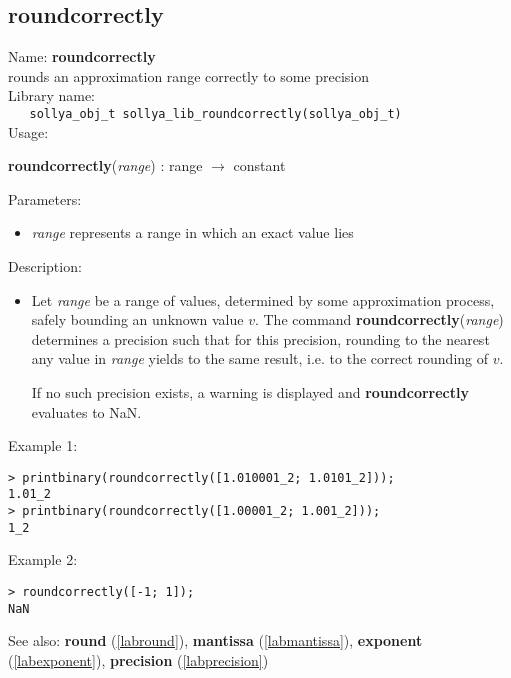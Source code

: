 \subsection{roundcorrectly}
\label{labroundcorrectly}
\noindent Name: \textbf{roundcorrectly}\\
\phantom{aaa}rounds an approximation range correctly to some precision\\[0.2cm]
\noindent Library name:\\
\verb|   sollya_obj_t sollya_lib_roundcorrectly(sollya_obj_t)|\\[0.2cm]
\noindent Usage: 
\begin{center}
\textbf{roundcorrectly}(\emph{range}) : \textsf{range} $\rightarrow$ \textsf{constant}\\
\end{center}
Parameters: 
\begin{itemize}
\item \emph{range} represents a range in which an exact value lies
\end{itemize}
\noindent Description: \begin{itemize}

\item Let \emph{range} be a range of values, determined by some approximation
   process, safely bounding an unknown value $v$. The command
   \textbf{roundcorrectly}(\emph{range}) determines a precision such that for this precision,
   rounding to the nearest any value in \emph{range} yields to the same
   result, i.e. to the correct rounding of $v$.
    
   If no such precision exists, a warning is displayed and \textbf{roundcorrectly}
   evaluates to NaN.
\end{itemize}
\noindent Example 1: 
\begin{center}\begin{minipage}{15cm}\begin{Verbatim}[frame=single]
> printbinary(roundcorrectly([1.010001_2; 1.0101_2]));
1.01_2
> printbinary(roundcorrectly([1.00001_2; 1.001_2]));
1_2
\end{Verbatim}
\end{minipage}\end{center}
\noindent Example 2: 
\begin{center}\begin{minipage}{15cm}\begin{Verbatim}[frame=single]
> roundcorrectly([-1; 1]);
NaN
\end{Verbatim}
\end{minipage}\end{center}
See also: \textbf{round} (\ref{labround}), \textbf{mantissa} (\ref{labmantissa}), \textbf{exponent} (\ref{labexponent}), \textbf{precision} (\ref{labprecision})
